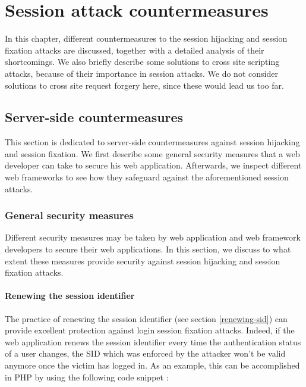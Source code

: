 \chapter{Session attack countermeasures}

In this chapter, different countermeasures to the session hijacking and session fixation attacks are discussed, together with a detailed analysis of their shortcomings. We also briefly describe some solutions to cross site scripting attacks, because of their importance in session attacks. We do not consider solutions to cross site request forgery here, since these would lead us too far.

\section{Server-side countermeasures}

This section is dedicated to server-side countermeasures against session hijacking and session fixation. We first describe some general security measures that a web developer can take to secure his web application. Afterwards, we inspect different web frameworks to see how they safeguard against the aforementioned session attacks.

\subsection{General security measures}\label{general-security}

Different security measures may be taken by web application and web framework developers to secure their web applications. In this section, we discuss to what extent these measures provide security against session hijacking and session fixation attacks.

\subsubsection{Renewing the session identifier}\label{renewing}

The practice of renewing the session identifier (see section \ref{renewing-sid}) can provide excellent protection against \gls{login session fixation} attacks. Indeed, if the web application renews the session identifier every time the authentication status of a user changes, the SID which was enforced by the attacker won't be valid anymore once the victim has logged in. As an example, this can be accomplished in PHP by using the following code snippet \cite{PHPregenerate,Johns2011}:

